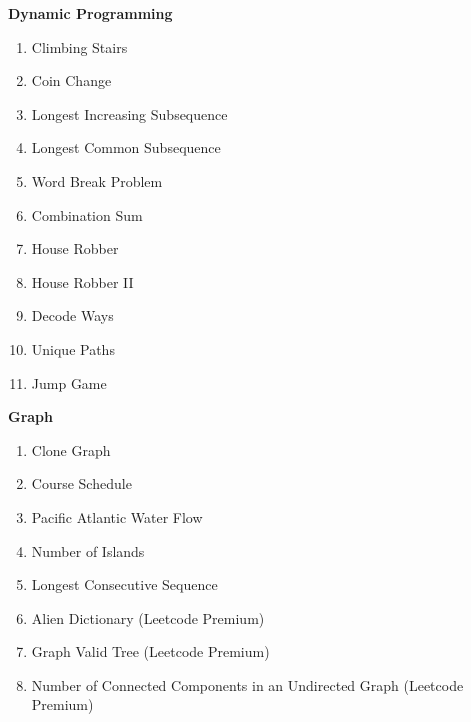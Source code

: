 \documentclass[24pt, a4]{article}
\begin{document}
\begin{multicols}{2}

\textbf{Dynamic Programming}
\begin{enumerate}
    \item{Climbing Stairs}
    \item{Coin Change}
    \item{Longest Increasing Subsequence}
    \item{Longest Common Subsequence}
    \item{Word Break Problem}
    \item{Combination Sum}
    \item{House Robber}
    \item{House Robber II}
    \item{Decode Ways}
    \item{Unique Paths}
    \item{Jump Game}
\end{enumerate}

\columnbreak

\textbf{Graph}
\begin{enumerate}
    \item{Clone Graph}
    \item{Course Schedule}
    \item{Pacific Atlantic Water Flow}
    \item{Number of Islands}
    \item{Longest Consecutive Sequence}
    \item{Alien Dictionary (Leetcode Premium)}
    \item{Graph Valid Tree (Leetcode Premium)}
    \item{Number of Connected Components in an Undirected Graph (Leetcode Premium)}
\end{enumerate}

\end{multicols}
\end{document}
